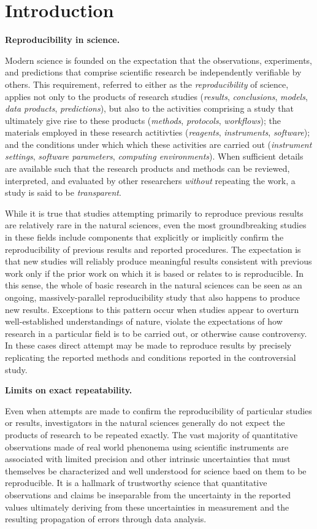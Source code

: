 \section{Introduction}

\textbf{Reproducibility in science.}

Modern science is founded on the expectation that the observations, experiments, and
	predictions that comprise scientific research be independently verifiable by others.
This requirement, referred to either as the \emph{reproducibility} of 
	science, applies not only to the products of research studies (\emph{results}, 
	\emph{conclusions}, \emph{models}, \emph{data products}, \emph{predictions}), but also to the 
	activities comprising a study that ultimately give rise to these products (\emph{methods}, 
	\emph{protocols}, \emph{workflows}); the materials employed in these 
	research actitivties (\emph{reagents}, \emph{instruments}, \emph{software}); and the conditions 
	under which which these activities are carried out (\emph{instrument settings}, \emph{software parameters},
	\emph{computing environments}).  When sufficient details are available
	such that the research products and methods can be reviewed, interpreted, and
	evaluated by other researchers \emph{without} repeating the work, a study is said to be 
	\emph{transparent}.

While it is true that studies attempting primarily to reproduce previous results are relatively rare in the
	natural sciences, even the most groundbreaking studies in these fields include components	
	that explicitly or implicitly confirm the reproducibility of previous results and reported procedures.
The expectation is that new studies will reliably produce meaningful results consistent with previous work 
	only if the prior work on which it is based or relates to is reproducible.
In this sense, the whole of basic research in the natural sciences can be seen as an ongoing, massively-parallel
	reproducibility study that also happens to produce new results.
Exceptions to this pattern occur when studies appear to overturn well-established understandings of nature,
	violate the expectations of how research in a particular field is to be carried out, or otherwise cause controversy.
In these cases direct attempt may be made to reproduce results by precisely replicating the reported methods
	and conditions reported in the controversial study.


\textbf{Limits on exact repeatability.}

Even when attempts are made to confirm the reproducibility of particular studies or results, investigators in
	the natural sciences generally do not expect the products of research to be repeated exactly.
The vast majority of quantitative observations made of real world phenonema using scientific instruments
	are associated with limited precision and other intrinsic uncertainties that must themselves be characterized
	and well understood for science baed on them to be reproducible.
It is a hallmark of trustworthy science that quantitative observations and claims be inseparable from the uncertainty
	in the reported values ultimately deriving from these uncertainties in measurement and the resulting
	propagation of errors through data analysis.

